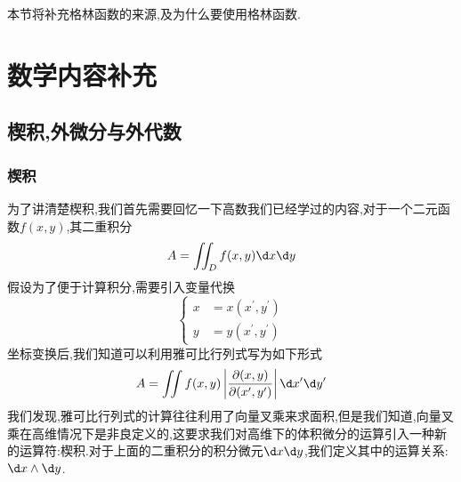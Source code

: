 本节将补充格林函数的来源,及为什么要使用格林函数.\\









\chapter{数学内容补充}
\section{楔积,外微分与外代数}
\subsection{楔积}
为了讲清楚楔积,我们首先需要回忆一下高数我们已经学过的内容,对于一个二元函数$f(x,y)$,其二重积分
\begin{equation}
    A=\iint_Df(x,y)\dx\dy
\end{equation}
假设为了便于计算积分,需要引入变量代换
\begin{equation}
    \begin{cases}x&=x(x^{\prime},y^{\prime})\\y&=y(x^{\prime},y^{\prime})\end{cases}
\end{equation}
坐标变换后,我们知道可以利用雅可比行列式写为如下形式
\begin{equation}
    A=\iint f(x,y)\left|\frac{\partial(x,y)}{\partial(x^{\prime},y^{\prime})}\right|\dx^{\prime}\dy^{\prime}
\end{equation}
我们发现,雅可比行列式的计算往往利用了向量叉乘来求面积,但是我们知道,向量叉乘在高维情况下是非良定义的,这要求我们对高维下的体积微分的运算引入一种新的运算符:楔积.对于上面的二重积分的积分微元$\dx\dy$,我们定义其中的运算关系:$\dx\wedge\dy$.


